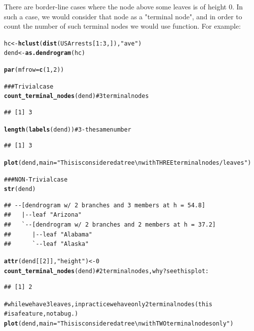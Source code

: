 \documentclass[shortnames,nojss,article]{jss}\usepackage{graphicx, color}
\makeatletter
\newcommand{\hlfunctioncall}[1]{\textcolor[rgb]{0.501960784313725,0,0.329411764705882}{\textbf{#1}}}%
\newcommand{\hlstring}[1]{\textcolor[rgb]{0.6,0.6,1}{#1}}%
\newcommand{\hlcomment}[1]{\textcolor[rgb]{0.180392156862745,0.6,0.341176470588235}{#1}}%
\newenvironment{kframe}{%
 \def\at@end@of@kframe{}%
 \ifinner\ifhmode%
  \def\at@end@of@kframe{\end{minipage}}%
  \begin{minipage}{\columnwidth}%
 \fi\fi%
 \def\FrameCommand##1{\hskip\@totalleftmargin \hskip-\fboxsep
 \colorbox{shadecolor}{##1}\hskip-\fboxsep
     \hskip-\linewidth \hskip-\@totalleftmargin \hskip\columnwidth}%
 \MakeFramed {\advance\hsize-\width
   \@totalleftmargin\z@ \linewidth\hsize
   \@setminipage}}%
 {\par\unskip\endMakeFramed%
 \at@end@of@kframe}
\newenvironment{knitrout}{}{} %
\makeatother
\begin{document}
There are border-line cases where the node above some leaves is of height 0. In such a case, we would consider that node as a "terminal node", and in order to count the number of such terminal nodes we would use  function. For example:

\begin{knitrout}
\color{fgcolor}\begin{kframe}
\begin{alltt}

hc <- \hlfunctioncall{hclust}(\hlfunctioncall{dist}(USArrests[1:3, ]), \hlstring{"ave"})
dend <- \hlfunctioncall{as.dendrogram}(hc)

\hlfunctioncall{par}(mfrow = \hlfunctioncall{c}(1, 2))

\hlcomment{### Trivial case}
\hlfunctioncall{count_terminal_nodes}(dend)  \hlcomment{# 3 terminal nodes}
\end{alltt}
\begin{verbatim}
## [1] 3
\end{verbatim}
\begin{alltt}
\hlfunctioncall{length}(\hlfunctioncall{labels}(dend))  \hlcomment{# 3 - the same number}
\end{alltt}
\begin{verbatim}
## [1] 3
\end{verbatim}
\begin{alltt}
\hlfunctioncall{plot}(dend, main = \hlstring{"This is considered a tree \textbackslash{}n with THREE terminal nodes/leaves"})

\hlcomment{### NON-Trivial case}
\hlfunctioncall{str}(dend)
\end{alltt}
\begin{verbatim}
## --[dendrogram w/ 2 branches and 3 members at h = 54.8]
##   |--leaf "Arizona" 
##   `--[dendrogram w/ 2 branches and 2 members at h = 37.2]
##      |--leaf "Alabama" 
##      `--leaf "Alaska"
\end{verbatim}
\begin{alltt}
\hlfunctioncall{attr}(dend[[2]], \hlstring{"height"}) <- 0
\hlfunctioncall{count_terminal_nodes}(dend)  \hlcomment{# 2 terminal nodes, why? see this plot:}
\end{alltt}
\begin{verbatim}
## [1] 2
\end{verbatim}
\begin{alltt}
\hlcomment{# while we have 3 leaves, in practice we have only 2 terminal nodes (this}
\hlcomment{# is a feature, not a bug.)}
\hlfunctioncall{plot}(dend, main = \hlstring{"This is considered a tree \textbackslash{}n with TWO terminal nodes only"})
\end{alltt}
\end{kframe}


\end{knitrout}
\end{document}
